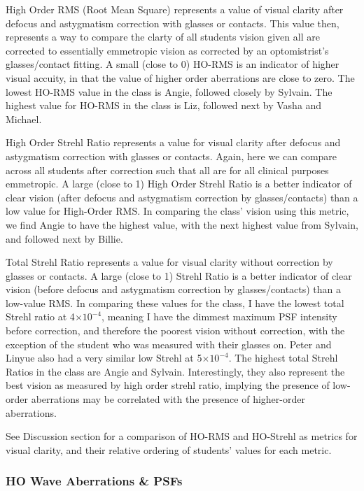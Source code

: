 \documentclass{article}
\providecommand{\e}[1]{\ensuremath{\times 10^{#1}}}
\begin{document}
High Order RMS (Root Mean Square) represents a value of visual clarity after defocus and astygmatism correction with glasses or contacts. This value then, represents a way to compare the clarty of all students vision given all are corrected to essentially emmetropic vision as corrected by an optomistrist's glasses/contact fitting. A small (close to 0) HO-RMS is an indicator of higher visual accuity, in that the value of higher order aberrations are close to zero. The lowest HO-RMS value in the class is Angie, followed closely by Sylvain. The highest value for HO-RMS in the class is Liz, followed next by Vasha and Michael.

High Order Strehl Ratio represents a value for visual clarity after defocus and astygmatism correction with glasses or contacts. Again, here we can compare across all students after correction such that all are for all clinical purposes emmetropic. A large (close to 1) High Order Strehl Ratio is a better indicator of clear vision (after defocus and astygmatism correction by glasses/contacts) than a low value for High-Order RMS. In comparing the class' vision using this metric, we find Angie to have the highest value, with the next highest value from Sylvain, and followed next by Billie.

Total Strehl Ratio represents a value for visual clarity without correction by glasses or contacts. A large (close to 1) Strehl Ratio is a better indicator of clear vision (before defocus and astygmatism correction by glasses/contacts) than a low-value RMS.  In comparing these values for the class, I have the lowest total Strehl ratio at 4\e{-4}, meaning I have the dimmest maximum PSF intensity before correction, and therefore the poorest vision without correction, with the exception of the student who was measured with their glasses on. Peter and Linyue also had a very similar low Strehl at 5\e{-4}. The highest total Strehl Ratios in the class are Angie and Sylvain. Interestingly, they also represent the best vision as measured by high order strehl ratio, implying the presence of low-order aberrations may be correlated with the presence of higher-order aberrations.

See Discussion section for a comparison of HO-RMS and HO-Strehl as metrics for visual clarity, and their relative ordering of students' values for each metric.

\subsubsection{HO Wave Aberrations \& PSFs}
\end{document}

